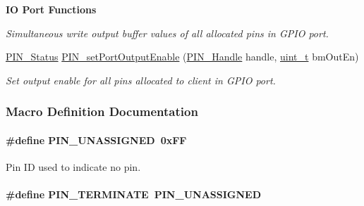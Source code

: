 \begin{Indent}{\bf I\-O Port Functions}
\begin{DoxyCompactItemize}
\begin{DoxyCompactList}\small\item\em Simultaneous write output buffer values of all allocated pins in G\-P\-I\-O port. \end{DoxyCompactList}\item 
\hyperlink{_p_i_n_8h_abe0ad59bbf09e51fe37195a5e70b23f6}{P\-I\-N\-\_\-\-Status} \hyperlink{_p_i_n_8h_a597fe2039644ee0389980d0a729de4e7}{P\-I\-N\-\_\-set\-Port\-Output\-Enable} (\hyperlink{_p_i_n_8h_afb2de52b054638f63c39df1f30a0d88d}{P\-I\-N\-\_\-\-Handle} handle, \hyperlink{_p_i_n_8h_a12a1e9b3ce141648783a82445d02b58d}{uint\-\_\-t} bm\-Out\-En)
\begin{DoxyCompactList}\small\item\em Set output enable for all pins allocated to client in G\-P\-I\-O port. \end{DoxyCompactList}\end{DoxyCompactItemize}
\end{Indent}


\subsubsection{Macro Definition Documentation}
\paragraph[{P\-I\-N\-\_\-\-U\-N\-A\-S\-S\-I\-G\-N\-E\-D}]{\setlength{\rightskip}{0pt plus 5cm}\#define P\-I\-N\-\_\-\-U\-N\-A\-S\-S\-I\-G\-N\-E\-D~0x\-F\-F}\label{_p_i_n_8h_aba219226dfdc9ea2fb82d6a7995395bf}


Pin I\-D used to indicate no pin. 

\paragraph[{P\-I\-N\-\_\-\-T\-E\-R\-M\-I\-N\-A\-T\-E}]{\setlength{\rightskip}{0pt plus 5cm}\#define P\-I\-N\-\_\-\-T\-E\-R\-M\-I\-N\-A\-T\-E~{\bf P\-I\-N\-\_\-\-U\-N\-A\-S\-S\-I\-G\-N\-E\-D}}\label{_p_i_n_8h_ae22ec44ad92ee130a665ca56aad38c75}



